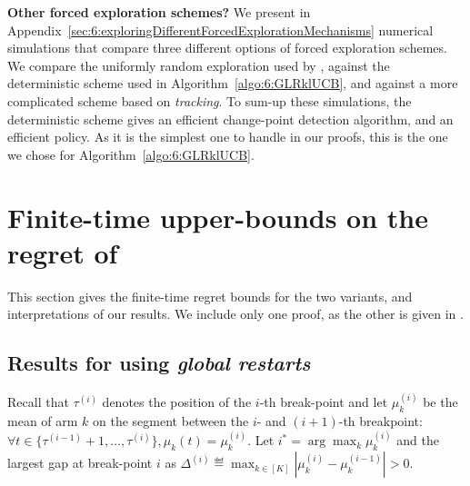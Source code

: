 \textbf{Other forced exploration schemes?}
%
We present in Appendix~\ref{sec:6:exploringDifferentForcedExplorationMechanisms} numerical simulations that compare three different options of forced exploration schemes.
We compare the uniformly random exploration used by \CUSUMUCB, against the deterministic scheme used in Algorithm~\ref{algo:6:GLRklUCB}, and against a more complicated scheme based on \emph{tracking}.
To sum-up these simulations, the deterministic scheme gives an efficient change-point detection algorithm, and an efficient \GLRklUCB{} policy.
As it is the simplest one to handle in our proofs, this is the one we chose for Algorithm~\ref{algo:6:GLRklUCB}.



\section{Finite-time upper-bounds on the regret of \GLRklUCB}
\label{sec:6:RegretAnalysis}

This section gives the finite-time regret bounds for the two variants, and interpretations of our results.
We include only one proof, as the other is given in \cite{Besson2019GLRT}.

\subsection{Results for \GLRklUCB{} using \emph{global restarts}}

Recall that $\tau^{(i)}$ denotes the position of the $i$-th break-point and let $\mu_k^{(i)}$ be the mean of arm $k$ on the segment between the $i$- and $(i+1)$-th breakpoint:
$\forall t \in \{ \tau^{(i-1)}+1, \dots, \tau^{(i)} \}, \mu_k(t) = \mu_k^{(i)}$.
Let $i^* = \arg\max_k \mu_k^{(i)} $ and the largest gap at break-point $i$ as $\Delta^{(i)} \eqdef \max_{k\in[K]} |\mu_k^{(i)} - \mu_k^{(i-1)}| >0$.


